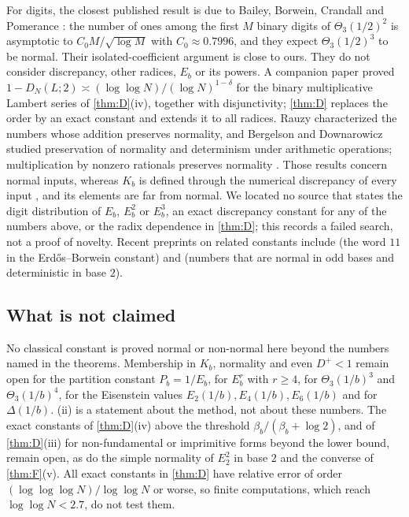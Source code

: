 \documentclass[11pt]{article}
\newcommand{\LL}{\log\log N}
\begin{document}
For digits, the closest published result is due to Bailey, Borwein, Crandall and
Pomerance \cite[\S9]{BBCP2004}: the number of ones among the first $M$ binary digits
of $\Theta_3(1/2)^2$ is asymptotic to $C_0M/\sqrt{\log M}$ with $C_0\approx0.7996$,
and they expect $\Theta_3(1/2)^3$ to be normal. Their isolated-coefficient argument
is close to ours. They do not consider discrepancy, other radices, $E_b$ or its
powers. A companion paper \cite{MultLambert} proved
$1-D_N(L;2)\asymp(\LL)/(\log N)^{1-\delta}$ for the binary multiplicative Lambert
series of \cref{thm:D}(iv), together with disjunctivity; \cref{thm:D} replaces
the order by an exact constant and extends it to all radices. Rauzy
\cite{Rauzy1976} characterized the numbers whose addition preserves normality, and
Bergelson and Downarowicz \cite{BD2025} studied preservation of normality and
determinism under arithmetic operations; multiplication by nonzero rationals
preserves normality \cite{Wall1949}. Those results concern normal inputs, whereas
$K_b$ is defined through the numerical discrepancy of every input
\cite{DiscrepancyCompanion}, and its elements are far from normal. We located no
source that states the digit distribution of $E_b$, $E_b^2$ or $E_b^3$, an exact
discrepancy constant for any of the numbers above, or the radix dependence in
\cref{thm:D}; this records a failed search, not a proof of novelty. Recent
preprints on related constants include \cite{Campbell2026} (the word $11$ in the
Erd\H{o}s--Borwein constant) and \cite{BecherLew2026} (numbers that are normal in
odd bases and deterministic in base $2$).

\subsection{What is not claimed}\label{subsec:notclaimed}

No classical constant is proved normal or non-normal here beyond the numbers named
in the theorems. Membership in $K_b$, normality and even $D^+<1$ remain open for
the partition constant $P_b=1/E_b$, for $E_b^r$ with $r\ge4$, for
$\Theta_3(1/b)^3$ and $\Theta_3(1/b)^4$, for the Eisenstein values
$E_2(1/b),E_4(1/b),E_6(1/b)$ and for $\Delta(1/b)$. (ii) is a statement
about the method, not about these numbers. The exact constants of
\cref{thm:D}(iv) above the threshold $\beta_b/(\beta_b+\log2)$, and of
\cref{thm:D}(iii) for non-fundamental or imprimitive forms beyond the lower bound,
remain open, as do the simple normality of $E_2^2$ in base $2$ and the converse of
\cref{thm:F}(v). All exact constants in \cref{thm:D} have relative error of order
$(\log\log\log N)/\log\log N$ or worse, so finite computations, which reach
$\log\log N<2.7$, do not test them.
\end{document}
